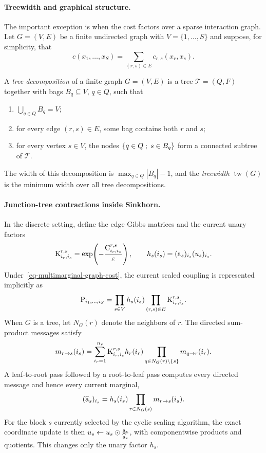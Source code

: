 \paragraph{Treewidth and graphical structure.}
The important exception is when the cost factors over a sparse interaction graph. Let $G=(V,E)$ be a finite undirected graph with $V=\{1,\ldots,S\}$ and suppose, for simplicity, that
\begin{equation}\label{eq-multimarginal-graph-cost}
c(x_1,\ldots,x_S)
=
\sum_{(r,s)\in E}c_{r,s}(x_r,x_s).
\end{equation}
\begin{defn}\label{def-treewidth}
A \emph{tree decomposition} of a finite graph $G=(V,E)$ is a tree $\mathcal T=(Q,F)$ together with bags $B_q\subseteq V$, $q\in Q$, such that
\begin{enumerate}
\item $\bigcup_{q\in Q}B_q=V$;
\item for every edge $(r,s)\in E$, some bag contains both $r$ and $s$;
\item for every vertex $s\in V$, the nodes $\left\{ q\in Q \;;\; s\in B_q \right\}$ form a connected subtree of $\mathcal T$.
\end{enumerate}
The width of this decomposition is $\max_{q\in Q}|B_q|-1$, and the \emph{treewidth} $\operatorname{tw}(G)$ is the minimum width over all tree decompositions.
\end{defn}
\paragraph{Junction-tree contractions inside Sinkhorn.}
In the discrete setting, define the edge Gibbs matrices and the current unary factors
\[
\mathrm{K}^{r,s}_{i_r,i_s}
=
\exp\!\left(-\frac{\mathrm{C}^{r,s}_{i_r,i_s}}{\varepsilon}\right),
\qquad
h_s(i_s)
=
(\mathrm{a}_s)_{i_s}(u_s)_{i_s}.
\]
Under~\eqref{eq-multimarginal-graph-cost}, the current scaled coupling is represented implicitly as
\begin{equation}\label{eq-multimarginal-graph-factorization}
\mathrm{P}_{i_1,\ldots,i_S}
=
\prod_{s\in V}h_s(i_s)
\prod_{(r,s)\in E}\mathrm{K}^{r,s}_{i_r,i_s}.
\end{equation}
When $G$ is a tree, let $N_G(r)$ denote the neighbors of $r$. The directed sum-product messages satisfy
\begin{equation}\label{eq-multimarginal-tree-message}
m_{r\to s}(i_s)
=
\sum_{i_r=1}^{n_r}
\mathrm{K}^{r,s}_{i_r,i_s}h_r(i_r)
\prod_{q\in N_G(r)\setminus\{s\}}
m_{q\to r}(i_r).
\end{equation}
A leaf-to-root pass followed by a root-to-leaf pass computes every directed message and hence every current marginal,
\begin{equation}\label{eq-multimarginal-tree-marginal}
(\widehat{\mathrm{a}}_s)_{i_s}
=
h_s(i_s)
\prod_{r\in N_G(s)}m_{r\to s}(i_s).
\end{equation}
For the block $s$ currently selected by the cyclic scaling algorithm, the exact coordinate update is then $u_s \leftarrow u_s\odot\frac{\mathrm{a}_s}{\widehat{\mathrm{a}}_s}$, with componentwise products and quotients. This changes only the unary factor $h_s$.

